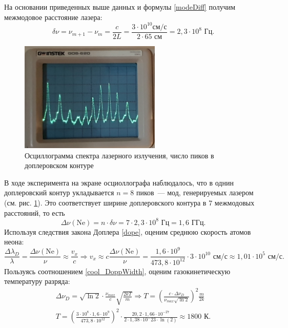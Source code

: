 На основании приведенных выше данных и формулы \eqref{modeDiff} получим межмодовое расстояние лазера: 
\[
\delta \nu = \nu_{m + 1} - \nu_{m} = \frac {c}{2L} = \frac {3 \cdot 10^{10} \text{см/с}}{2 \cdot 65 \text{ см}} = 2,3 \cdot 10^8 \text{ Гц}.
\]
\begin{figure}[hb]
    \centering
    \includegraphics[width=0.6\textwidth]{oscar_3.jpg}
    \caption{Осциллограмма спектра лазерного излучения, число пиков в доплеровском контуре}
    \label{fig:oscar_3}
\end{figure}
В ходе эксперимента на экране осциоллографа наблюдалось, что в однин доплеровский контур укладывается $n = 8$ пиков~--- мод, генерируемых лазером (см. рис. \ref{fig:oscar_3}). Это соответствует ширине доплеровского контура в $7$ межмодовых расстояний, то есть 
\[
\Delta \nu(\text{Ne}) = n \cdot \delta \nu = 7 \cdot 2,3 \cdot 10^8 \text{ Гц} = 1,6 \text{ ГГц}.
\]
Используя следствия закона Доплера \eqref{dope}, оценим среднюю скорость атомов неона:
\[
\frac{\Delta \lambda_D}{\lambda} = 
\frac{\Delta \nu (\text{Ne}) }{ \nu } \approx 
\frac{v_x}{c} \Longrightarrow 
v_x \approx c \frac{\Delta \nu (\text{Ne})}{\nu} = 
\frac{1,6 \cdot 10^9}{473,8 \cdot 10^{12}} \cdot 3 \cdot 10^{10} \text{ см/с} \approx 1,01 \cdot 10^5 \text{ см/с}.
\]
Пользуясь соотношением \eqref{cool_DoppWidth}, оценим газокинетическую температуру разряда:
\begin{gather*}
\Delta\nu_D = \sqrt{\ln 2}\cdot\frac{\nu_{max}}{c}\sqrt{\frac{2kT}{m}} \Longrightarrow 
T = \left(\frac{c\cdot \Delta \nu_D }{\nu_{max} \sqrt{\ln{2}}} \right)^2 \frac{m}{2k} \\
T = \left(\frac{3 \cdot 10^8 \cdot 1,6 \cdot 10^9 }{473,8 \cdot 10^{12}} \right)^2 \cdot \frac{20,2 \cdot 1,66 \cdot 10^{-27}}{2 \cdot 1,38 \cdot 10^-23 \cdot \ln(2)} \approx 1800 \text{ К}.
\end{gather*}

